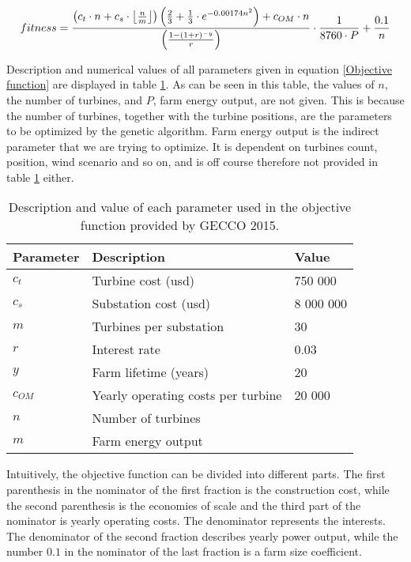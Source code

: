 \begin{small}
\begin{equation}
fitness =  \frac{ \left( c_t \cdot n + c_s \cdot \floor*{\frac{n}{m}} \right) \left( \frac{2}{3} + \frac{1}{3} \cdot e^{-0.00174n^2} \right) + c_{OM} \cdot n}{\left( \frac{1 - (1 + r)^{-y}}{r} \right) } \cdot \frac{1}{8760 \cdot P} + \frac{0.1}{n}
\label{Objective function} 
\end{equation}
\end{small}


\noindent Description and numerical values of all parameters given in equation \ref{Objective function} are displayed in table \ref{Parameters}. As can be seen in this table, the values of $n$, the number of turbines, and $P$, farm energy output, are not given. This is because the number of turbines, together with the turbine positions, are the parameters to be optimized by the genetic algorithm. Farm energy output is the indirect parameter that we are trying to optimize. It is dependent on turbines count, position, wind scenario and so on, and is off course therefore not provided in table \ref{Parameters} either.\\


\begin{table}[h!]
\begin{center}
\caption{Description and value of each parameter used in the objective function provided by GECCO 2015.}
\label{Parameters}
\begin{tabular}{l|l|l}
\textbf{Parameter} & \textbf{Description} & \textbf{Value} \\ 
\hline 
$c_t$ & Turbine cost (usd) & 750 000 \\ 
$c_s$ & Substation cost (usd) & 8 000 000 \\ 
$m$ & Turbines per substation & 30 \\ 
$r$ & Interest rate & 0.03 \\ 
$y$ & Farm lifetime (years) & 20 \\ 
$c_{OM}$ & Yearly operating costs per turbine & 20 000 \\ 
$n$ & Number of turbines &  \\ 
$m$ & Farm energy output &  \\  
\end{tabular} 
\end{center}
\end{table}


\noindent Intuitively, the objective function can be divided into different parts. The first parenthesis in the nominator of the first fraction is the construction cost, while the second parenthesis is the economies of scale and the third part of the nominator is yearly operating costs. The denominator represents the interests. The denominator of the second fraction describes yearly power output, while the number $0.1$ in the nominator of the last fraction is a farm size coefficient. \\


